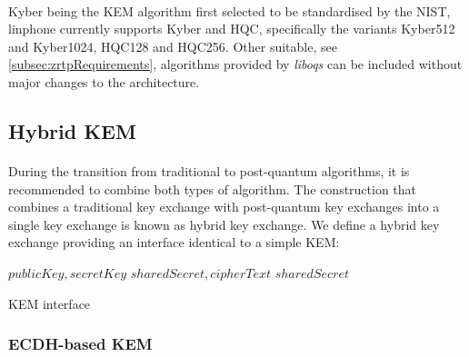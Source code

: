 \documentclass[a4paper,11pt]{article}
\begin{document}
\paragraph{}Kyber being the KEM algorithm first selected to be standardised by the NIST, linphone currently supports Kyber and HQC, specifically the variants Kyber512 and Kyber1024, HQC128 and HQC256. Other suitable, see \ref{subsec:zrtpRequirements}, algorithms provided by \textit{liboqs} can be included without major changes to the architecture.

\subsection{Hybrid KEM}
\paragraph{}During the transition from traditional to post-quantum algorithms, it is recommended to combine both types of algorithm. The construction that combines a traditional key
   exchange with post-quantum key exchanges into a single key exchange is known as hybrid key exchange. We define a hybrid key exchange providing an interface identical to a simple KEM:
  \begin{algorithm}
  \begin{algorithmic}
    \State \Return $publicKey,secretKey$
  \EndFunction
  \Statex
    \State \Return $sharedSecret,cipherText$
  \EndFunction
  \Statex
    \State \Return $sharedSecret$
  \EndFunction
  \end{algorithmic}
  \caption{KEM interface}
  \end{algorithm}
  \FloatBarrier

\subsubsection{ECDH-based KEM}
\end{document}
